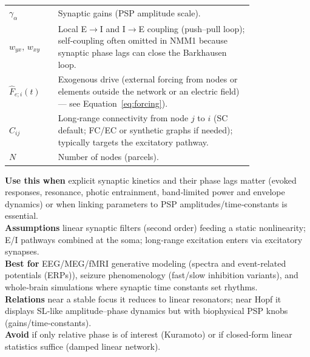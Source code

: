 \documentclass[12pt]{article}
\numberwithin{equation}{section}
\begin{document}
\begin{tcolorbox}
\begin{tabular}{@{}l p{0.8\linewidth}@{}}
\textbf{$\gamma_{\alpha}$} & Synaptic gains (PSP amplitude scale).\\
\textbf{$w_{yx},\,w_{xy}$} & Local E$\!\to$I and I$\!\to$E coupling (push–pull loop); self‑coupling often omitted in NMM1 because synaptic phase lags can close the Barkhausen loop.\\
\textbf{$\hat F_{e;i}(t)$}& Exogenous drive  (external forcing from nodes or elements outside the network or an electric field)--- see Equation~\ref{eq:forcing}).\\
\textbf{$C_{ij}$} & Long‑range connectivity from node $j$ to $i$ (SC default; FC/EC or synthetic graphs if needed); typically targets the excitatory pathway.\\
\textbf{$N$} & Number of nodes (parcels).\\
\end{tabular}
\end{tcolorbox}

\begin{tcolorbox}[
  colback=gray!5,
  colframe=slate,
  colbacktitle=softblue!25,
  coltitle=softblue!60!black,
  fonttitle=\bfseries\small,
  title={\small When to Use It},
  boxrule=0.4pt, enhanced, sharp corners,
  left=4pt,right=4pt,top=3pt,bottom=3pt,
  boxsep=2pt, before skip=6pt, after skip=6pt
]
\scriptsize
\textbf{Use this when} explicit synaptic kinetics and their phase lags matter (evoked responses, resonance, photic entrainment, band‑limited power and envelope dynamics) or when linking parameters to PSP amplitudes/time‑constants is essential.\\
\textbf{Assumptions} linear synaptic filters (second order) feeding a static nonlinearity; E/I pathways combined at the soma; long‑range excitation enters via excitatory synapses.\\
\textbf{Best for} EEG/MEG/fMRI generative modeling (spectra and event-related potentials (ERPs)), seizure phenomenology (fast/slow inhibition variants), and whole‑brain simulations where synaptic time constants set rhythms.\\
\textbf{Relations} near a stable focus it reduces to linear resonators; near Hopf it displays SL‑like amplitude–phase dynamics but with biophysical PSP knobs (gains/time‑constants).\\
\textbf{Avoid} if only relative phase is of interest (Kuramoto) or if closed‑form linear statistics suffice (damped linear network).
\end{tcolorbox}
\end{document}
